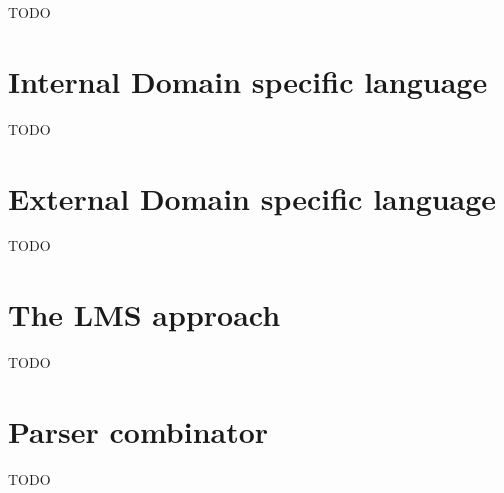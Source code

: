 \label{chap:dsl_in_scala}

TODO

\section{Internal Domain specific language}
\label{sec:scala_internal_dsl}

TODO

\section{External Domain specific language}
\label{sec:scala_external_dsl}

TODO

\section{The LMS approach}
\label{sec:lms_approach}

TODO

\section{Parser combinator}
\label{sec:parser_combinator}

TODO

